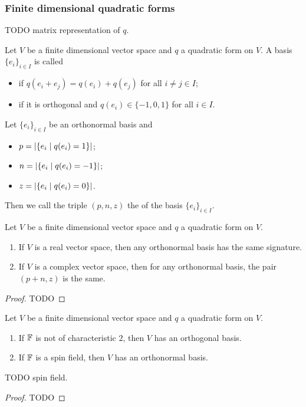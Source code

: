 \subsubsection{Finite dimensional quadratic forms}
TODO matrix representation of $q$.
\begin{definition}
Let $V$ be a finite dimensional vector space and $q$ a quadratic form on $V$. A basis $\{e_i\}_{i\in I}$ is called
\begin{itemize}
\item {} if $q(e_i + e_j) = q(e_i) + q(e_j)$ for all $i\neq j \in I$;
\item {} if it is orthogonal and $q(e_i)\in \{-1,0,1\}$ for all $i \in I$.
\end{itemize}
Let $\{e_i\}_{i\in I}$ be an orthonormal basis and
\begin{itemize}
    \item $p = |\setbuilder{e_i}{q(e_i) = 1}|$;
    \item $n = |\setbuilder{e_i}{q(e_i) = -1}|$;
    \item $z = |\setbuilder{e_i}{q(e_i) = 0}|$.
\end{itemize}
Then we call the triple $(p,n,z)$ the  of the basis $\{e_i\}_{i\in I}$.
\end{definition}

\begin{theorem}
Let $V$ be a finite dimensional vector space and $q$ a quadratic form on $V$.
\begin{enumerate}
\item If $V$ is a real vector space, then any orthonormal basis has the same signature.
\item If $V$ is a complex vector space, then for any orthonormal basis, the pair $(p+n,z)$ is the same.
\end{enumerate}
\end{theorem}
\begin{proof}
TODO
\end{proof}

\begin{proposition}
Let $V$ be a finite dimensional vector space and $q$ a quadratic form on $V$.
\begin{enumerate}
\item If $\mathbb{F}$ is not of characteristic $2$, then $V$ has an orthogonal basis.
\item If $\mathbb{F}$ is a spin field, then $V$ has an orthonormal basis.
\end{enumerate}
\end{proposition}
TODO spin field.
\begin{proof}
TODO
\end{proof}


